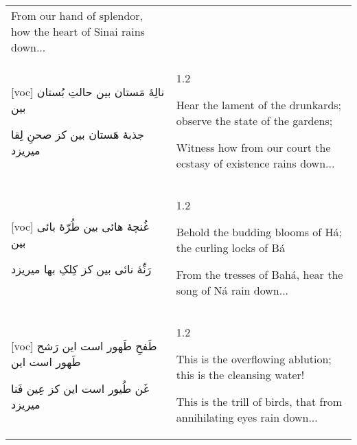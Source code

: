 \documentclass[11pt]{article}
\makeatletter
\newenvironment{orig}
  {\begin{farsi}[voc]}
  {\end{farsi}}
\newenvironment{trans}
  {\Large\begin{spacing}{1.2}\raggedright}
  {\end{spacing}}
\newenvironment{word}
  {\begin{tabular}[t]{p{2.75in}@{\hspace{3em}}p{2.875in}}}
  {\end{tabular}}
\newcommand{\ayat}[2]{\begin{orig}#1\end{orig} & \begin{trans}#2\end{trans}}
\makeatother
\begin{document}
\begin{word}
{From our hand of splendor, how the heart of Sinai rains down...
} \\ \ayat{
نالِۀ مَستان بین حالتِ بُستان بین

جذبۀ هَستان بین کز صحنِ لِقا میریزد
}{
Hear the lament of the drunkards; observe the state of the gardens;

Witness how from our court the ecstasy of existence rains down...
} \\ \ayat{
غُنچۀ هائی بین طُرّۀ بائی بین

رَنِّۀ نائی بین کز کِلکِ بها میریزد
}{
Behold the budding blooms of Há; the curling locks of Bá

From the tresses of Bahá, hear the song of Ná rain down...
} \\ \ayat{
طَفحِ طَهور است این رَشح طَهور است این

غَن طُیور است این کز عِین فَنا میریزد
}{
This is the overflowing ablution; this is the cleansing water!

This is the trill of birds, that from annihilating eyes rain down...
}
\end{word}
\end{document}
